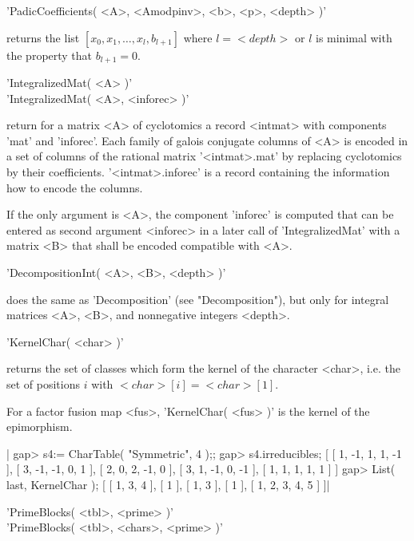 \vspace{5mm}
'PadicCoefficients( <A>, <Amodpinv>, <b>, <p>, <depth> )'%

returns the list $[ x_0, x_1, \ldots, x_l, b_{l+1} ]$ where $l = <depth>$
or $l$ is minimal with the property that $b_{l+1} = 0$.

\vspace{5mm}
'IntegralizedMat( <A> )'%
\\
'IntegralizedMat( <A>, <inforec> )'

return for a matrix <A> of cyclotomics a  record <intmat> with components
'mat' and 'inforec'.  Each  family of galois  conjugate columns of <A> is
encoded  in  a set of columns  of  the rational  matrix '<intmat>.mat' by
replacing  cyclotomics  by their coefficients.    '<intmat>.inforec' is a
record containing the information how to encode the columns.

If the only argument is <A>, the component 'inforec' is computed that can
be  entered as    second   argument <inforec>    in a   later    call  of
'IntegralizedMat' with a matrix <B> that shall be encoded compatible with
<A>.

\vspace{5mm}
'DecompositionInt( <A>, <B>, <depth> )'%

does the   same as 'Decomposition'  (see  "Decomposition"),  but only for
integral matrices <A>, <B>, and nonnegative integers <depth>.


'KernelChar( <char> )'

returns the set of classes which form the kernel of the character <char>,
i.e. the set of positions $i$ with $<char>[i] = <char>[1]$.

For a factor fusion map <fus>, 'KernelChar( <fus> )' is the kernel of the
epimorphism.

|    gap> s4:= CharTable( "Symmetric", 4 );;
    gap> s4.irreducibles;
    [ [ 1, -1, 1, 1, -1 ], [ 3, -1, -1, 0, 1 ], [ 2, 0, 2, -1, 0 ],
      [ 3, 1, -1, 0, -1 ], [ 1, 1, 1, 1, 1 ] ]
    gap> List( last, KernelChar );
    [ [ 1, 3, 4 ], [ 1 ], [ 1, 3 ], [ 1 ], [ 1, 2, 3, 4, 5 ] ]|


'PrimeBlocks( <tbl>, <prime> )'\\
'PrimeBlocks( <tbl>, <chars>, <prime> )'

